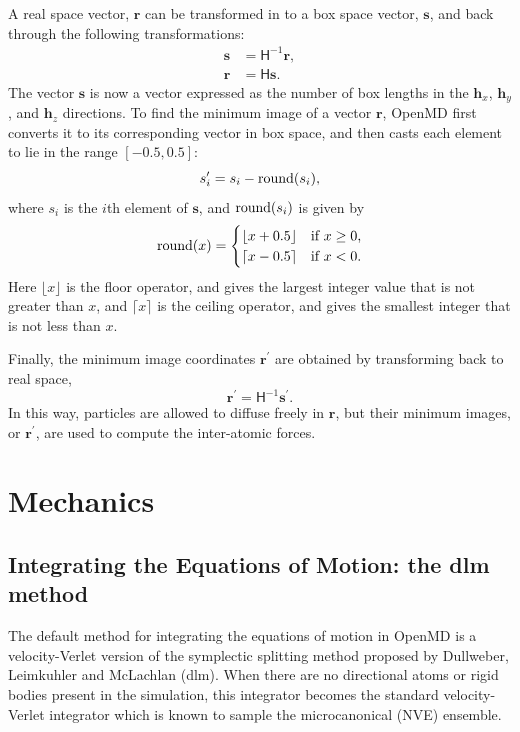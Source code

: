 \documentclass[]{book}
\begin{document}
A real space vector, $\mathbf{r}$ can be transformed in to a box space
vector, $\mathbf{s}$, and back through the following transformations:
\begin{align}
\mathbf{s} &= \mathsf{H}^{-1} \mathbf{r}, \\
\mathbf{r} &= \mathsf{H} \mathbf{s}.
\end{align}
The vector $\mathbf{s}$ is now a vector expressed as the number of box
lengths in the $\mathbf{h}_x$, $\mathbf{h}_y$, and $\mathbf{h}_z$
directions. To find the minimum image of a vector $\mathbf{r}$, {\sc
OpenMD} first converts it to its corresponding vector in box space, and
then casts each element to lie in the range $[-0.5,0.5]$:
\begin{equation}
s_{i}^{\prime}=s_{i}-\operatorname{round}(s_{i}),
\end{equation}
where $s_i$ is the $i$th element of $\mathbf{s}$, and
$\operatorname{round}(s_i)$ is given by
\begin{equation}
\operatorname{round}(x) =
	\begin{cases}
	\lfloor x+0.5 \rfloor & \text{if $x \ge 0$,} \\
	\lceil x-0.5 \rceil & \text{if $x < 0$.}
	\end{cases}
\end{equation}
Here $\lfloor x \rfloor$ is the floor operator, and gives the largest
integer value that is not greater than $x$, and $\lceil x \rceil$ is
the ceiling operator, and gives the smallest integer that is not less
than $x$. 

Finally, the minimum image coordinates $\mathbf{r}^{\prime}$ are
obtained by transforming back to real space,
\begin{equation}
\mathbf{r}^{\prime}=\mathsf{H}^{-1}\mathbf{s}^{\prime}.%
\end{equation}
In this way, particles are allowed to diffuse freely in $\mathbf{r}$,
but their minimum images, or $\mathbf{r}^{\prime}$, are used to compute
the inter-atomic forces.

\chapter{\label{section:mechanics}Mechanics}

\section{\label{section:integrate}Integrating the Equations of Motion: the
{\sc dlm} method}

The default method for integrating the equations of motion in {\sc
OpenMD} is a velocity-Verlet version of the symplectic splitting method
proposed by Dullweber, Leimkuhler and McLachlan
({\sc dlm}).\cite{Dullweber1997} When there are no directional atoms or
rigid bodies present in the simulation, this integrator becomes the
standard velocity-Verlet integrator which is known to sample the
microcanonical (NVE) ensemble.\cite{Frenkel1996}
\end{document}
